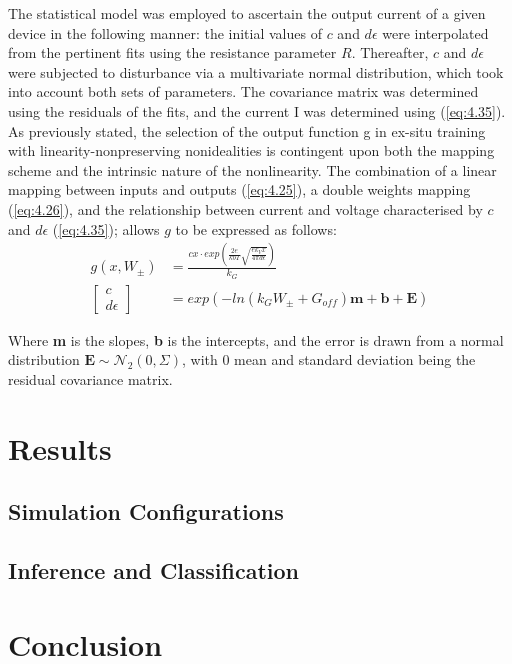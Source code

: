 \noindent The statistical model was employed to ascertain the output current of a given device in the following manner: the initial values of $c$ and $d\epsilon$ were interpolated from the pertinent fits using the resistance parameter $R$. Thereafter, $c$ and $d\epsilon$ were subjected to disturbance via a multivariate normal distribution, which took into account both sets of parameters. The covariance matrix was determined using the residuals of the fits, and the current I was determined using (\ref{eq:4.35}).\\

\noindent As previously stated, the selection of the output function g in ex-situ training with linearity-nonpreserving nonidealities is contingent upon both the mapping scheme and the intrinsic nature of the nonlinearity. The combination of a linear mapping between inputs and outputs (\ref{eq:4.25}), a double weights mapping (\ref{eq:4.26}), and the relationship between current and voltage characterised by $c$ and $d\epsilon$ (\ref{eq:4.35}); allows $g$ to be expressed as follows:
\begin{align}
g\left( x, W_\pm \right) &= \frac{cx\cdot exp\left( \frac{2e}{kbT} \sqrt{\frac{ek_Vx}{4\pi d\epsilon}} \right)}{k_G} \label{eq:4.36} \\
\begin{bmatrix} c \\  d\epsilon \end{bmatrix} &= exp\left( -ln\left( k_GW_\pm + G_{off} \right)\textbf{m} + \textbf{b} + \textbf{E} \right) \label{eq:4.37}
\end{align}

\noindent Where \textbf{m} is the slopes, \textbf{b} is the intercepts, and the error is drawn from a normal distribution $\textbf{E} \sim \mathcal{N}_2\left( 0, \Sigma \right)$, with 0 mean and standard deviation being the residual covariance matrix.

\section[Results]{Results}


\subsection[Simulation Configurations]{Simulation Configurations}

\subsection{Inference and Classification}



\section[Conclusion]{Conclusion}
